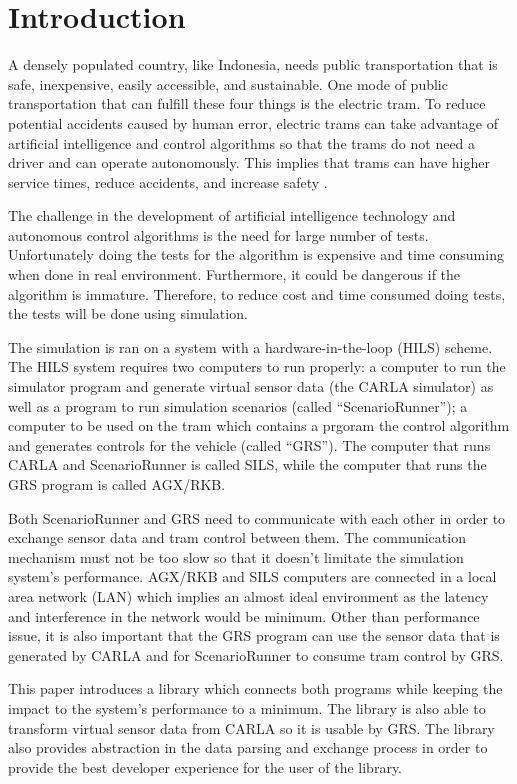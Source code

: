 \section{Introduction}

A densely populated country, like Indonesia, needs public transportation that is
safe, inexpensive, easily accessible, and sustainable. One mode of public
transportation that can fulfill these four things is the electric tram. To
reduce potential accidents caused by human error, electric trams can take
advantage of artificial intelligence and control algorithms so that the trams do
not need a driver and can operate autonomously. This implies that trams can have
higher service times, reduce accidents, and increase safety
\cite{trilaksono_laporanRispro}.

The challenge in the development of artificial intelligence technology and
autonomous control algorithms is the need for large number of tests.
Unfortunately doing the tests for the algorithm is expensive and time consuming
when done in real environment. Furthermore, it could be dangerous if the
algorithm is immature. Therefore, to reduce cost and time consumed doing tests,
the tests will be done using simulation.

The simulation is ran on a system with a hardware-in-the-loop (HILS) scheme. The
HILS system requires two computers to run properly: a computer to run the
simulator program and generate virtual sensor data (the CARLA simulator) as well
as a program to run simulation scenarios (called ``ScenarioRunner''); a computer
to be used on the tram which contains a prgoram the control algorithm and
generates controls for the vehicle (called ``GRS''). The computer that runs
CARLA and ScenarioRunner is called SILS, while the computer that runs the GRS
program is called AGX/RKB.

Both ScenarioRunner and GRS need to communicate with each other in order to
exchange sensor data and tram control between them. The communication mechanism
must not be too slow so that it doesn't limitate the simulation system's
performance. AGX/RKB and SILS computers are connected in a local area network
(LAN) which implies an almost ideal environment as the latency and interference
in the network would be minimum. Other than performance issue, it is also
important that the GRS program can use the sensor data that is generated by
CARLA and for ScenarioRunner to consume tram control by GRS.

This paper introduces a library which connects both programs while keeping the
impact to the system's performance to a minimum. The library is also able to
transform virtual sensor data from CARLA so it is usable by GRS. The library
also provides abstraction in the data parsing and exchange process in order to
provide the best developer experience for the user of the library.